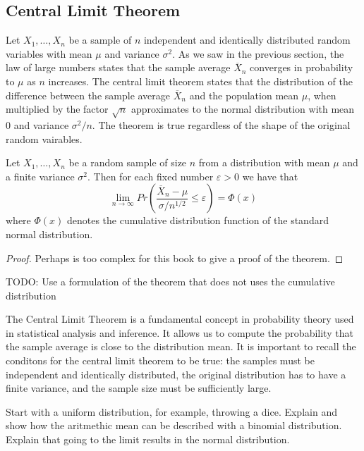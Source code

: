 
\subsection{Central Limit Theorem}

Let $X_1, \ldots, X_n$ be a sample of $n$ independent and identically distributed random variables with mean $\mu$ and variance $\sigma^2$. As we saw in the previous section, the law of large numbers states that the sample average $\overline {X}_n$ converges in probability to $\mu$ as $n$ increases. The central limit theorem states that the distribution of the difference between the sample average $\overline {X}_n$ and the population mean $\mu$, when multiplied by the factor $\sqrt {n}$ approximates to the normal distribution with mean $0$ and variance $\sigma^2 / n$. The theorem is true regardless of the shape of the original random vairables.

\begin{theorem}
\label{th:central_limit_theorem}
Let $X_{1}, \ldots, X_{n}$ be a random sample of size $n$ from a distribution with mean $\mu$ and a finite variance $\sigma^{2}$. Then  for each fixed number $\varepsilon > 0$ we have that
\[
\lim_{n \rightarrow \infty} Pr \left( \frac{\overline{X}_{n}-\mu}{\sigma/n^{1/2}} \leq \varepsilon \right) = \Phi \left( x \right)
\]
where $\Phi \left( x \right)$ denotes the cumulative distribution function of the standard normal distribution.
\end{theorem}
\begin{proof}
{\color{red} Perhaps is too complex for this book to give a proof of the theorem.}
\end{proof}

{\color{red} TODO: Use a formulation of the theorem that does not uses the cumulative distribution}

The Central Limit Theorem is a fundamental concept in probability theory used in statistical analysis and inference. It allows us to compute the probability that the sample average is close to the distribution mean. It is important to recall the conditons for the central limit theorem to be true: the samples must be independent and identically distributed, the original distribution has to have a finite variance, and the sample size must be sufficiently large.

\begin{example}
{\color{red} Start with a uniform distribution, for example, throwing a dice. Explain and show how the aritmethic mean can be described with a binomial distribution. Explain that going to the limit results in the normal distribution.}
\end{example}

